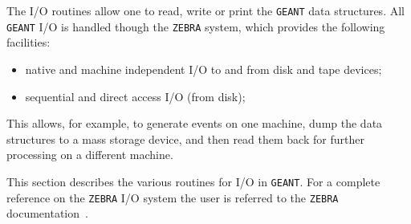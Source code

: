           
          

The I/O routines allow one to read, write or print the
{\tt GEANT} data structures. All {\tt GEANT} I/O is handled though
the {\tt ZEBRA} system, which provides the following facilities:
\begin{itemize}
\item native and machine independent I/O to and from disk and tape
devices;
\item sequential and direct access I/O (from disk);
\end{itemize}

This allows, for example, to generate events on one machine, dump
the data structures to a mass storage device, and then read them
back for further processing on a different machine.

This section describes the various routines for I/O in {\tt GEANT}.
For a complete reference on the {\tt ZEBRA} I/O system the user
is referred to the {\tt ZEBRA} documentation~\cite{bib-ZEBRAFZ,bib-ZEBRA}.
